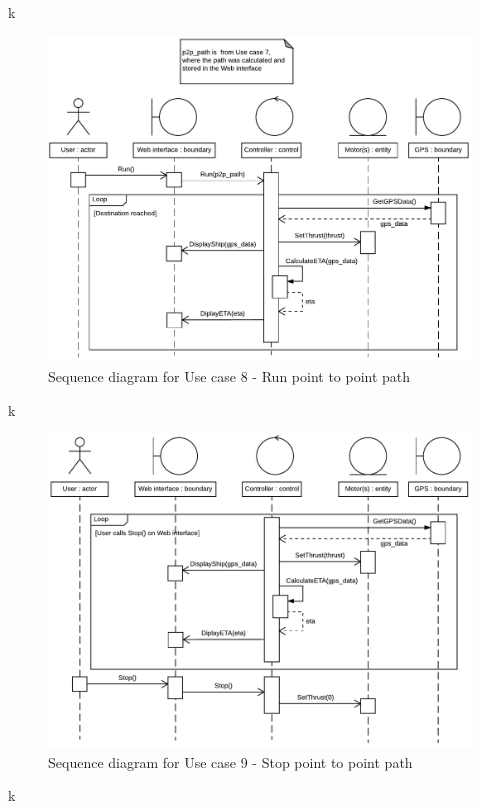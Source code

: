 k

\begin{figure}[H]
	\centering
	\includegraphics[width=1\linewidth]{Images/System_architecture/Use_case_8_SD}
	\caption{Sequence diagram for Use case 8 - Run point to point path}
\end{figure}

k

\begin{figure}[H]
	\centering
	\includegraphics[width=1\linewidth]{Images/System_architecture/Use_case_9_SD}
	\caption{Sequence diagram for Use case 9 - Stop point to point path}
\end{figure}

k

